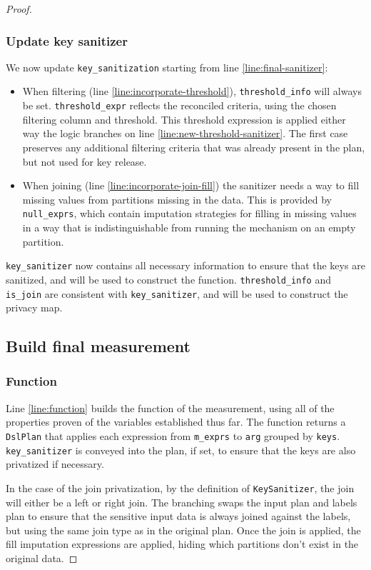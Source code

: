 \documentclass{article}
\begin{document}
\begin{proof}
\subsubsection{Update key sanitizer}
We now update \texttt{key\_sanitization} starting from line \ref{line:final-sanitizer}:
\begin{itemize}
    \item When filtering (line \ref{line:incorporate-threshold}), \texttt{threshold\_info} will always be set. 
    \texttt{threshold\_expr} reflects the reconciled criteria, using the chosen filtering column and threshold. 
    This threshold expression is applied either way the logic branches on line \ref{line:new-threshold-sanitizer}.
    The first case preserves any additional filtering criteria that was already present in the plan, but not used for key release.
    \item When joining (line \ref{line:incorporate-join-fill}) the sanitizer needs a way to fill missing values from partitions missing in the data.
    This is provided by \texttt{null\_exprs}, which contain imputation strategies for filling in missing values 
    in a way that is indistinguishable from running the mechanism on an empty partition.
\end{itemize}

\texttt{key\_sanitizer} now contains all necessary information to ensure that the keys are sanitized, 
and will be used to construct the function.
\texttt{threshold\_info} and \texttt{is\_join} are consistent with \texttt{key\_sanitizer}, 
and will be used to construct the privacy map.

\subsection{Build final measurement}
\subsubsection{Function}
Line \ref{line:function} builds the function of the measurement,
using all of the properties proven of the variables established thus far.
The function returns a \texttt{DslPlan} that applies each expression from \texttt{m\_exprs}
to \texttt{arg} grouped by \texttt{keys}.
\texttt{key\_sanitizer} is conveyed into the plan, if set, 
to ensure that the keys are also privatized if necessary.

In the case of the join privatization, by the definition of \texttt{KeySanitizer},
the join will either be a left or right join.
The branching swaps the input plan and labels plan to ensure that the sensitive input data is always joined against the labels,
but using the same join type as in the original plan.
Once the join is applied, the fill imputation expressions are applied, hiding which partitions don't exist in the original data.


\end{proof}
\end{document}

